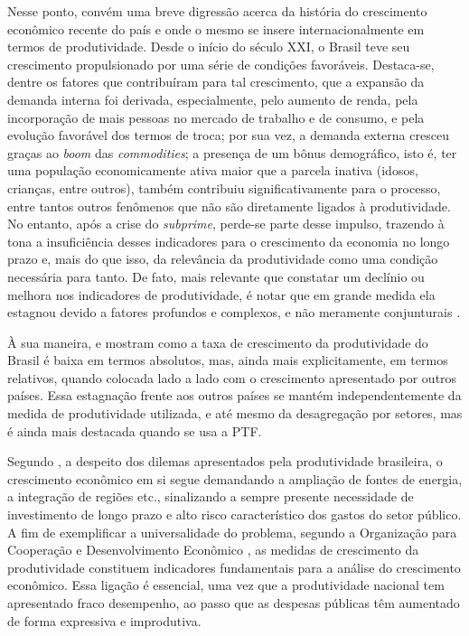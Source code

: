\documentclass[
  12pt,
  a4paper,
  oneside,
  brazil,
  chapter=TITLE,
  section=TITLE
]{abntex2}
\begin{document}
Nesse ponto, convém uma breve digressão acerca da história do crescimento econômico recente do país e onde o mesmo se insere internacionalmente em termos de produtividade. Desde o início do século XXI, o Brasil teve seu crescimento propulsionado por uma série de condições favoráveis. Destaca-se, dentre os fatores que contribuíram para tal crescimento, que a expansão da demanda interna foi derivada, especialmente, pelo aumento de renda, pela incorporação de mais pessoas no mercado de trabalho e de consumo, e pela evolução favorável dos termos de troca; por sua vez, a demanda externa cresceu graças ao \textit{boom} das \textit{commodities}; a presença de um bônus demográfico, isto é, ter uma população economicamente ativa maior que a parcela inativa (idosos, crianças, entre outros), também contribuiu significativamente para o processo, entre tantos outros fenômenos que não são diretamente ligados à produtividade. No entanto, após a crise do \textit{subprime}, perde-se parte desse impulso, trazendo à tona a insuficiência desses indicadores para o crescimento da economia no longo prazo e, mais do que isso, da relevância da produtividade como uma condição necessária para tanto. De fato, mais relevante que constatar um declínio ou melhora nos indicadores de produtividade, é notar que em grande medida ela estagnou devido a fatores profundos e complexos, e não meramente conjunturais \cite{denegri2014}.

À sua maneira,  e  mostram como a taxa de crescimento da produtividade do Brasil é baixa em termos absolutos, mas, ainda mais explicitamente, em termos relativos, quando colocada lado a lado com o crescimento apresentado por outros países. Essa estagnação frente aos outros países se mantém independentemente da medida de produtividade utilizada, e até mesmo da desagregação por setores, mas é ainda mais destacada quando se usa a PTF.

Segundo , a despeito dos dilemas apresentados pela produtividade brasileira, o crescimento econômico em si segue demandando a ampliação de fontes de energia, a integração de regiões etc., sinalizando a sempre presente necessidade de investimento de longo prazo e alto risco característico dos gastos do setor público. A fim de exemplificar a universalidade do problema, segundo a Organização para Cooperação e Desenvolvimento Econômico \cite{oecd2001}, as medidas de crescimento da produtividade constituem indicadores fundamentais para a análise do crescimento econômico. Essa ligação é essencial, uma vez que a produtividade nacional tem apresentado fraco desempenho, ao passo que as despesas públicas têm aumentado de forma expressiva e improdutiva.
\end{document}
